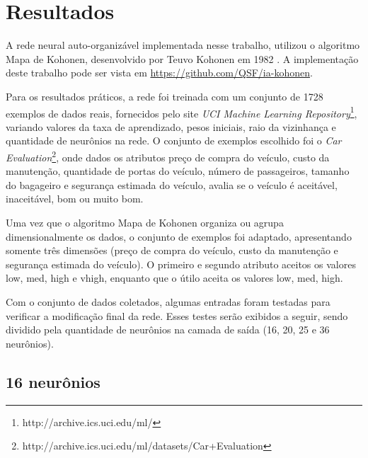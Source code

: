 \section{Resultados}
A rede neural auto-organizável implementada nesse trabalho, utilizou o algoritmo Mapa de Kohonen, desenvolvido por
Teuvo Kohonen em 1982 \cite{Kohonen}. A implementação deste trabalho pode ser vista em \url{https://github.com/QSF/ia-kohonen}.

Para os resultados práticos, a rede foi treinada com um conjunto de 1728 exemplos de dados reais, fornecidos pelo site \textit{UCI Machine Learning Repository}\footnote{http://archive.ics.uci.edu/ml/}, variando valores da taxa de aprendizado, pesos iniciais, raio da vizinhança e quantidade de neurônios na rede. O conjunto de exemplos escolhido foi o \textit{Car Evaluation}\footnote{http://archive.ics.uci.edu/ml/datasets/Car+Evaluation}, onde dados os atributos preço de compra do veículo, custo da manutenção, quantidade de portas do veículo, número de passageiros, tamanho do bagageiro e segurança estimada do veículo, avalia se o veículo é aceitável, inaceitável, bom ou muito bom.

Uma vez que o algoritmo Mapa de Kohonen organiza ou agrupa dimensionalmente os dados, o conjunto de exemplos foi adaptado, apresentando somente três dimensões (preço de compra do veículo, custo da manutenção e segurança estimada do veículo). O primeiro e segundo atributo aceitos os valores {low, med, high e vhigh}, enquanto que o útilo aceita os valores {low, med, high}.

Com o conjunto de dados coletados, algumas entradas foram testadas para verificar a modificação final da rede. Esses testes serão exibidos a seguir, sendo dividido pela quantidade de neurônios na camada de saída (16, 20, 25 e 36 neurônios).

\subsection{16 neurônios} %
\label{sub:16_neuronios}

